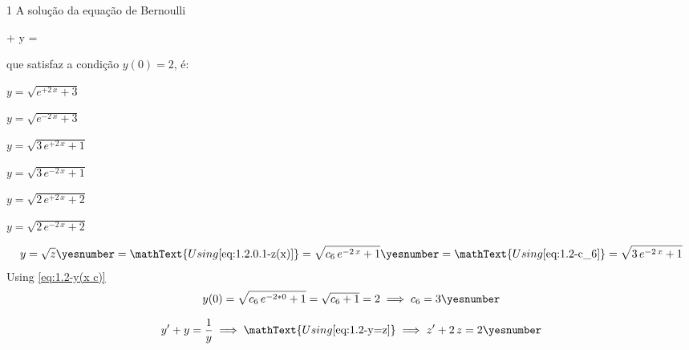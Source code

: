 \documentclass["AM3C-tests_resolutions.tex"]{subfiles}
\begin{document}
\begin{questionBox}1{} %
  A solução da equação de Bernoulli
  \begin{BM}
     + y = 
  \end{BM}
  que satisfaz a condição \(y(0)=2\), é:
  \begin{itemize}[label=\square]
    \begin{multicols}{3}
      \item \(y=\sqrt{e^{+2\,x}+3}\)
      \item \(y=\sqrt{e^{-2\,x}+3}\)
      \item \(y=\sqrt{3\,e^{+2\,x}+1}\)
      \item[\blacksquare]\(y=\sqrt{3\,e^{-2\,x}+1}\)
      \item \(y=\sqrt{2\,e^{+2\,x}+2}\)
      \item \(y=\sqrt{2\,e^{-2\,x}+2}\)
    \end{multicols}
  \end{itemize}

  \answer{}

  \begin{gather*}
    y
    = \sqrt{z}
    \yesnumber\label{eq:1.2-y=z}
    = \mathText{Using \eqref{eq:1.2.0.1-z(x)}}
    = \sqrt{
      c_6\,e^{-2\,x}
      +1
    }
    \yesnumber\label{eq:1.2-y(x c)}
    = \mathText{Using \eqref{eq:1.2-c_6}}
    = \sqrt{3\,e^{-2\,x}+1}
  \end{gather*}
  Using \eqref{eq:1.2-y(x c)}
  \begin{gather*}
    y(0)
    = \sqrt{
      c_6\,e^{-2*0}
      + 1
    }
    = \sqrt{
      c_6
      + 1
    }
    = 2
    \implies
    c_6=3
    \yesnumber\label{eq:1.2-c_6}
  \end{gather*}

  \begin{gather*}
    y' + y = \frac{1}{y}
    \implies \mathText{Using \eqref{eq:1.2-y=z}}
    \implies 
    z' + 2\,z = 2
    \yesnumber\label{eq:1.2-z(z')}
  \end{gather*}


\end{questionBox}
\end{document}
